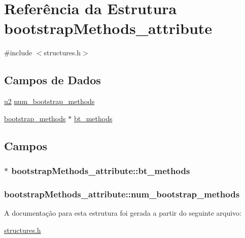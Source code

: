 \hypertarget{structbootstrapMethods__attribute}{}\section{Referência da Estrutura bootstrap\+Methods\+\_\+attribute}
\label{structbootstrapMethods__attribute}


{\ttfamily \#include $<$structures.\+h$>$}

\subsection*{Campos de Dados}
\begin{DoxyCompactItemize}
\item 
\hyperlink{lista__operandos_8h_a732cde1300aafb73b0ea6c2558a7a54f}{u2} \hyperlink{structbootstrapMethods__attribute_aad5dc2c56be879fe48451587b71c6715}{num\+\_\+bootstrap\+\_\+methods}
\item 
\hyperlink{structbootstrap__methods}{bootstrap\+\_\+methods} $\ast$ \hyperlink{structbootstrapMethods__attribute_a602dcc74faa430494a9c300edf2a74c3}{bt\+\_\+methods}
\end{DoxyCompactItemize}


\subsection{Campos}
\subsubsection[{\texorpdfstring{bt\+\_\+methods}{bt_methods}}]{$\ast$ bootstrap\+Methods\+\_\+attribute\+::bt\+\_\+methods}\hypertarget{structbootstrapMethods__attribute_a602dcc74faa430494a9c300edf2a74c3}{}\label{structbootstrapMethods__attribute_a602dcc74faa430494a9c300edf2a74c3}
\subsubsection[{\texorpdfstring{num\+\_\+bootstrap\+\_\+methods}{num_bootstrap_methods}}]{ bootstrap\+Methods\+\_\+attribute\+::num\+\_\+bootstrap\+\_\+methods}\hypertarget{structbootstrapMethods__attribute_aad5dc2c56be879fe48451587b71c6715}{}\label{structbootstrapMethods__attribute_aad5dc2c56be879fe48451587b71c6715}


A documentação para esta estrutura foi gerada a partir do seguinte arquivo\+:\begin{DoxyCompactItemize}
\item 
\hyperlink{structures_8h}{structures.\+h}\end{DoxyCompactItemize}
